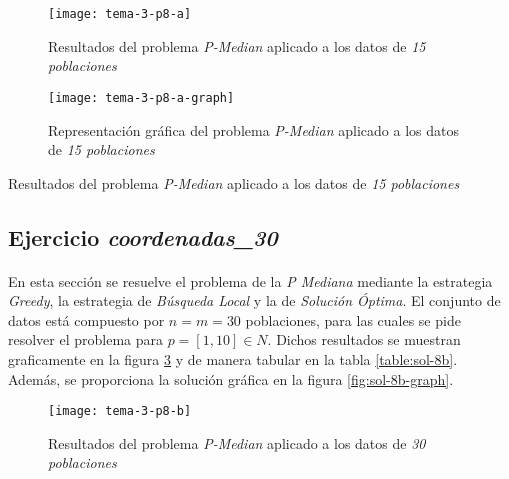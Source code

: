 \documentclass[spanish]{article}
\begin{document}
			\begin{figure}[h]
				\begin{center}
					\texttt{[image: tema-3-p8-a]}
				\end{center}
				\caption{Resultados del problema \emph{P-Median} aplicado a los datos de \emph{15 poblaciones}}
				\label{fig:sol-8a}
			\end{figure}

			\begin{figure}[h]
				\begin{center}
					\texttt{[image: tema-3-p8-a-graph]}
				\end{center}
				\caption{Representación gráfica del problema \emph{P-Median} aplicado a los datos de \emph{15 poblaciones}}
				\label{fig:sol-8a-graph}
			\end{figure}

			\begin{table}[h]
				\begin{center}
				\end{center}
				\caption{Resultados del problema \emph{P-Median} aplicado a los datos de \emph{15 poblaciones}}
				\label{table:sol-8a}
			\end{table}


		\subsection{Ejercicio \emph{coordenadas\_30}}
		\label{sec:e-8b}

			\paragraph{}
			En esta sección se resuelve el problema de la \emph{P Mediana} mediante la estrategia \emph{Greedy}, la estrategia de \emph{Búsqueda Local} y la de \emph{Solución Óptima}. El conjunto de datos está compuesto por $n = m = 30$ poblaciones, para las cuales se pide resolver el problema para $p = [1,10] \in N$. Dichos resultados se muestran graficamente en la figura \ref{fig:sol-8b} y de manera tabular en la tabla \ref{table:sol-8b}. Además, se proporciona la solución gráfica en la figura \ref{fig:sol-8b-graph}.


			\begin{figure}[h]
				\begin{center}
					\texttt{[image: tema-3-p8-b]}
				\end{center}
				\caption{Resultados del problema \emph{P-Median} aplicado a los datos de \emph{30 poblaciones}}
				\label{fig:sol-8b}
			\end{figure}
\end{document}
